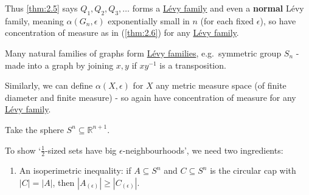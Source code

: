 \documentclass{article}
\let\subset\subseteq
\begin{document}
Thus \cref{thm:2.5} says $Q_1, Q_2, Q_3, \dotsc$ forms a \hyperlink{def:levyfam}{L\'evy family} and even a \textbf{normal} L\'evy family, meaning $\alpha(G_n, \epsilon)$ exponentially small in $n$ (for each fixed $\epsilon$), so have concentration of measure as in (\cref{thm:2.6}) for any \hyperlink{def:levyfam}{L\'evy family}.

Many natural families of graphs form \hyperlink{def:levyfam}{L\'evy families}, e.g.\ symmetric group $S_n$ - made into a graph by joining $x,y$ if $x y^{-1}$ is a transposition.

Similarly, we can define $\alpha(X, \epsilon)$ for $X$ any metric measure space (of finite diameter and finite measure) - so again have concentration of measure for any \hyperlink{def:levyfam}{L\'evy family}.
\begin{eg}
  Take the sphere $S^n \subset \mathbb{R}^{n+1}$.
  \begin{center}
  \end{center}
  To show `$\frac{1}{2}$-sized sets have big $\epsilon$-neighbourhoods', we need two ingredients:
  \begin{enumerate}[label=\arabic*)]
    \item An isoperimetric inequality: if $A \subset S^n$ and $C \subset S^n$ is the circular cap with $|C| = |A|$, then $|A_{(\epsilon)}| \geq |C_{(\epsilon)}|$.
      \begin{center}
      \end{center}


\end{enumerate}
\end{eg}
\end{document}
